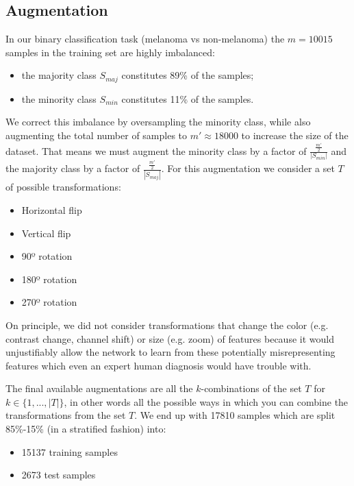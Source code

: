 \subsection{Augmentation}
\label{subsection:augmentation}

In our binary classification task (melanoma vs non-melanoma) the $m = 10015$ samples in the training set are highly imbalanced:

\begin{itemize}
    \item the majority class $S_{maj}$ constitutes 89\% of the samples;
    \item the minority class $S_{min}$ constitutes 11\% of the samples.
\end{itemize}

We correct this imbalance by oversampling the minority class, while also augmenting the total number of samples to $m' \approx 18000$ to increase the size of the dataset. That means we must augment the minority class by a factor of $\frac{\frac{m'}{2}}{|S_{min}|}$ and the majority class by a factor of $\frac{\frac{m'}{2}}{|S_{maj}|}$. For this augmentation we consider a set $T$ of possible transformations:

\begin{itemize}
    \item Horizontal flip
    \item Vertical flip
    \item 90º rotation
    \item 180º rotation
    \item 270º rotation
\end{itemize}

On principle, we did not consider transformations that change the color (e.g. contrast change, channel shift) or size (e.g. zoom) of features because it would unjustifiably allow the network to learn from these potentially misrepresenting features which even an expert human diagnosis would have trouble with.

The final available augmentations are all the $k$-combinations of the set $T$ for $k \in \{1, ..., |T|\}$, in other words all the possible ways in which you can combine the transformations from the set $T$. We end up with 17810 samples which are split 85\%-15\% (in a stratified fashion) into:

\begin{itemize}
    \item 15137 training samples
    \item 2673 test samples
\end{itemize}


